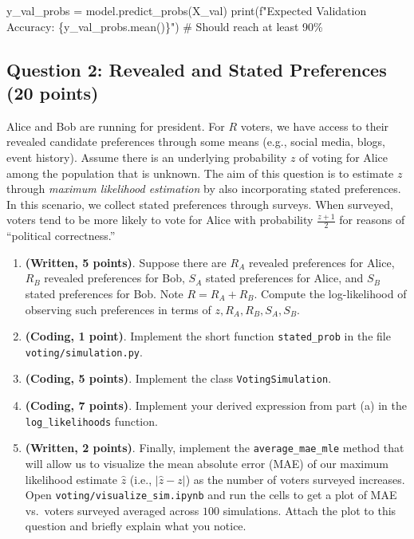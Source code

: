 \documentclass[
  letterpaper,
  numbers=noenddot,
  DIV=11]{scrreprt}
\newenvironment{Shaded}{\begin{snugshade}}{\end{snugshade}}
\newcommand{\BuiltInTok}[1]{\textcolor[rgb]{0.00,0.23,0.31}{#1}}
\newcommand{\CommentTok}[1]{\textcolor[rgb]{0.37,0.37,0.37}{#1}}
\newcommand{\NormalTok}[1]{\textcolor[rgb]{0.00,0.23,0.31}{#1}}
\newcommand{\OperatorTok}[1]{\textcolor[rgb]{0.37,0.37,0.37}{#1}}
\newcommand{\SpecialCharTok}[1]{\textcolor[rgb]{0.37,0.37,0.37}{#1}}
\newcommand{\SpecialStringTok}[1]{\textcolor[rgb]{0.13,0.47,0.30}{#1}}
\theoremstyle{definition}
\theoremstyle{plain}
\theoremstyle{plain}
\theoremstyle{remark}
\begin{document}
\begin{tcolorbox}[colframe=.grey, title=\faCode \enspace Code]
\begin{Shaded}
\begin{Highlighting}[numbers=left,,]
\NormalTok{    y\_val\_probs }\OperatorTok{=}\NormalTok{ model.predict\_probs(X\_val)}
    \BuiltInTok{print}\NormalTok{(}\SpecialStringTok{f"Expected Validation Accuracy: }\SpecialCharTok{\{}\NormalTok{y\_val\_probs}\SpecialCharTok{.}\NormalTok{mean()}\SpecialCharTok{\}}\SpecialStringTok{"}\NormalTok{) }\CommentTok{\# Should reach at least 90\%}
\end{Highlighting}
\end{Shaded}

\end{tcolorbox}

\subsection*{Question 2: Revealed and Stated Preferences (20
points)}\label{question-2-revealed-and-stated-preferences-20-points}

Alice and Bob are running for president. For \(R\) voters, we have
access to their revealed candidate preferences through some means (e.g.,
social media, blogs, event history). Assume there is an underlying
probability \(z\) of voting for Alice among the population that is
unknown. The aim of this question is to estimate \(z\) through
\emph{maximum likelihood estimation} by also incorporating stated
preferences. In this scenario, we collect stated preferences through
surveys. When surveyed, voters tend to be more likely to vote for Alice
with probability \(\frac{z+1}{2}\) for reasons of ``political
correctness.''

\begin{enumerate}
\def\labelenumi{(\alph{enumi})}
\item
  \textbf{(Written, 5 points)}. Suppose there are \(R_A\) revealed
  preferences for Alice, \(R_B\) revealed preferences for Bob, \(S_A\)
  stated preferences for Alice, and \(S_B\) stated preferences for Bob.
  Note \(R=R_A+R_B\). Compute the log-likelihood of observing such
  preferences in terms of \(z, R_A, R_B, S_A, S_B\).
\item
  \textbf{(Coding, 1 point)}. Implement the short function
  \texttt{stated\_prob} in the file \texttt{voting/simulation.py}.
\item
  \textbf{(Coding, 5 points)}. Implement the class
  \texttt{VotingSimulation}.
\item
  \textbf{(Coding, 7 points)}. Implement your derived expression from
  part (a) in the \texttt{log\_likelihoods} function.
\item
  \textbf{(Written, 2 points)}. Finally, implement the
  \texttt{average\_mae\_mle} method that will allow us to visualize the
  mean absolute error (MAE) of our maximum likelihood estimate
  \(\hat{z}\) (i.e., \(|\hat{z}-z|\)) as the number of voters surveyed
  increases. Open \texttt{voting/visualize\_sim.ipynb} and run the cells
  to get a plot of MAE vs.~voters surveyed averaged across \(100\)
  simulations. Attach the plot to this question and briefly explain what
  you notice.
\end{enumerate}
\end{document}
